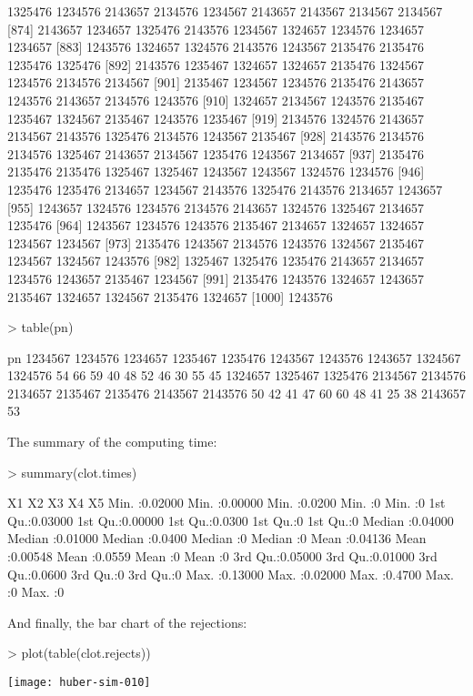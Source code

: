\documentclass{scrartcl}
\begin{document}
\begin{Schunk}
\begin{Soutput}
 [865] 1325476 1234576 2143657 2134576 1234567 2143657 2143567 2134567 2134567
 [874] 2143657 1234657 1325476 2143576 1234567 1324657 1234576 1234657 1234657
 [883] 1243576 1324657 1324576 2143576 1243567 2135476 2135476 1235476 1325476
 [892] 2143576 1235467 1324657 1324657 2135476 1324567 1234576 2134576 2134567
 [901] 2135467 1234567 1234576 2135476 2143657 1243576 2143657 2134576 1243576
 [910] 1324657 2134567 1243576 2135467 1235467 1324567 2135467 1243576 1235467
 [919] 2134576 1324576 2143657 2134567 2143576 1325476 2134576 1243567 2135467
 [928] 2143576 2134576 2134576 1325467 2143657 2134567 1235476 1243567 2134657
 [937] 2135476 2135476 2135476 1325467 1325467 1243567 1243567 1324576 1234576
 [946] 1235476 1235476 2134657 1234567 2143576 1325476 2143576 2134657 1243657
 [955] 1243657 1324576 1234576 2134576 2143657 1324576 1325467 2134657 1235476
 [964] 1243567 1234576 1243576 2135467 2134657 1324657 1324657 1234567 1234567
 [973] 2135476 1243567 2134576 1243576 1324567 2135467 1234567 1324567 1243576
 [982] 1325467 1325476 1235476 2143657 2134657 1234576 1243657 2135467 1234567
 [991] 2135476 1243576 1324657 1243657 2135467 1324657 1324567 2135476 1324657
[1000] 1243576
\end{Soutput}
\begin{Sinput}
> table(pn)
\end{Sinput}
\begin{Soutput}
pn
1234567 1234576 1234657 1235467 1235476 1243567 1243576 1243657 1324567 1324576 
     54      66      59      40      48      52      46      30      55      45 
1324657 1325467 1325476 2134567 2134576 2134657 2135467 2135476 2143567 2143576 
     50      42      41      47      60      60      48      41      25      38 
2143657 
     53 
\end{Soutput}
\end{Schunk}

The summary of the computing time:

\begin{Schunk}
\begin{Sinput}
> summary(clot.times)
\end{Sinput}
\begin{Soutput}
       X1                X2                X3               X4          X5   
 Min.   :0.02000   Min.   :0.00000   Min.   :0.0200   Min.   :0   Min.   :0  
 1st Qu.:0.03000   1st Qu.:0.00000   1st Qu.:0.0300   1st Qu.:0   1st Qu.:0  
 Median :0.04000   Median :0.01000   Median :0.0400   Median :0   Median :0  
 Mean   :0.04136   Mean   :0.00548   Mean   :0.0559   Mean   :0   Mean   :0  
 3rd Qu.:0.05000   3rd Qu.:0.01000   3rd Qu.:0.0600   3rd Qu.:0   3rd Qu.:0  
 Max.   :0.13000   Max.   :0.02000   Max.   :0.4700   Max.   :0   Max.   :0  
\end{Soutput}
\end{Schunk}

And finally, the bar chart of the rejections:

\begin{Schunk}
\begin{Sinput}
> plot(table(clot.rejects))
\end{Sinput}
\end{Schunk}
\texttt{[image: huber-sim-010]}
\end{document}
